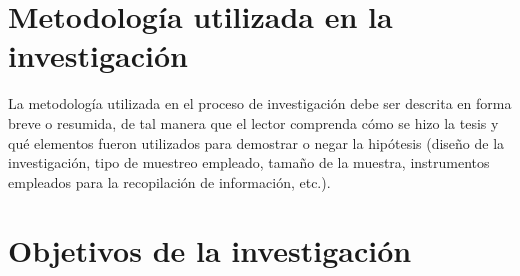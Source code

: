 \section{Metodología utilizada en la investigación}
La metodología utilizada en el proceso de investigación debe ser descrita en forma breve o resumida, de tal manera que el lector comprenda cómo se hizo la tesis y qué elementos fueron utilizados para demostrar o negar la hipótesis (diseño de la investigación, tipo de muestreo empleado, tamaño de la muestra, instrumentos empleados para la recopilación de información, etc.).


\newpage




\section{Objetivos de la investigación}

